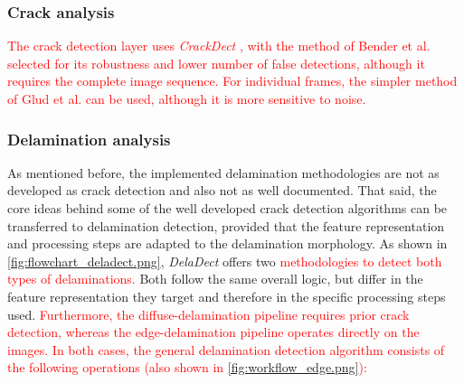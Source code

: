 \documentclass[final,5p,times]{elsarticle}
\newcommand{\revision}[1]{\textcolor{red}{#1}}
\begin{document}
	\subsubsection{Crack analysis}
	\label{loc:software_description.software_architecture.crack_analysis}
	\revision{The crack detection layer uses \emph{CrackDect} \cite{drvodericVersion02CrackDect2022}, with the method of Bender et al.\ \cite{benderEffectVariableAmplitude2021} selected for its robustness and lower number of false detections, although it requires the complete image sequence. For individual frames, the simpler method of Glud et al. \cite{gludAutomatedCountingOffaxis2016} can be used, although it is more sensitive to noise.}
	
	\subsubsection{Delamination analysis}
	\label{loc:software_description.software_architecture.delamination_analysis}
	
	As mentioned before, the implemented delamination methodologies are not as developed as crack detection and also not as well documented. That said, the core ideas behind some of the well developed crack detection algorithms can be transferred to delamination detection, provided that the feature representation and processing steps are adapted to the delamination morphology. As shown in \autoref{fig:flowchart_deladect.png}, \emph{DelaDect} offers two \revision{methodologies to detect both types of delaminations.} Both follow the same overall logic, but  differ in the feature representation they target and therefore in the specific processing steps used. \revision{Furthermore, the diffuse-delamination pipeline requires prior crack detection, whereas the edge-delamination pipeline operates directly on the images. In both cases, the general delamination detection algorithm consists of the following operations (also shown in \autoref{fig:workflow_edge.png}):}
	
\end{document}
